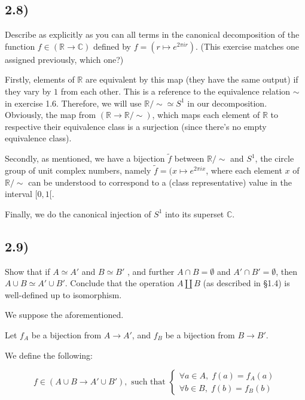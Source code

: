 \documentclass[12pt, letterpaper, twoside]{report}
\begin{document}
\subsection*{2.8)}

Describe as explicitly as you can all terms in the canonical decomposition of the function $f \in (\mathbb{R} \to \mathbb{C})$ defined by $f = (r \mapsto e^{2 \pi i r})$. (This exercise matches one assigned previously, which one?)

Firstly, elements of $\mathbb{R}$ are equivalent by this map (they have the same output) if they vary by $1$ from each other. This is a reference to the equivalence relation $\sim$ in exercise 1.6. Therefore, we will use $\mathbb{R}/\sim \simeq S^1$ in our decomposition. Obviously, the map from $(\mathbb{R} \to \mathbb{R}/\sim)$, which maps each element of $\mathbb{R}$ to respective their equivalence class is a surjection (since there's no empty equivalence class).

Secondly, as mentioned, we have a bijection $\tilde{f}$ between $\mathbb{R}/\sim$ and $S^1$, the circle group of unit complex numbers, namely $\tilde{f} = (x \mapsto e^{2 \pi i x}$, where each element $x$ of $\mathbb{R}/\sim$ can be understood to correspond to a (class representative) value in the interval $[0, 1[$.

Finally, we do the canonical injection of $S^1$ into its superset $\mathbb{C}$.



\subsection*{2.9)}

Show that if $A \simeq A'$ and $B \simeq B'$ , and further $A \cap B = \emptyset$ and $A' \cap B' = \emptyset$, then $A \cup B \simeq A' \cup B'$. Conclude that the operation $A \coprod B$ (as described in §1.4) is well-defined up to isomorphism.

We suppose the aforementioned.

Let $f_A$ be a bijection from $A \to A'$, and $f_B$ be a bijection from $B \to B'$.

We define the following:

$$
f \in (A \cup B \to A' \cup B'),
\text{ such that }
\begin{cases}
	\forall a \in A, \; f(a) = f_A(a) \\
	\forall b \in B, \; f(b) = f_B(b)
\end{cases}
$$
\end{document}
